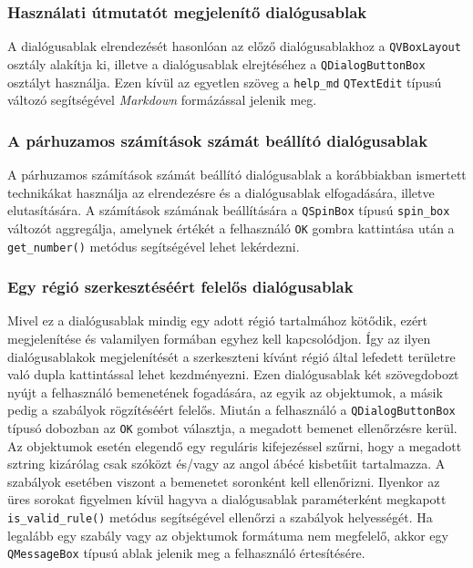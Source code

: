 \subsubsection{Használati útmutatót megjelenítő dialógusablak}

A dialógusablak elrendezését hasonlóan az előző dialógusablakhoz a \verb|QVBoxLayout| osztály alakítja ki, illetve a dialógusablak elrejtéséhez a \verb|QDialogButtonBox| osztályt használja. Ezen kívül az egyetlen szöveg a \verb|help_md| \verb|QTextEdit| típusú változó segítségével \textit{Markdown} formázással jelenik meg.

\subsubsection{A párhuzamos számítások számát beállító dialógusablak}

A párhuzamos számítások számát beállító dialógusablak a korábbiakban ismertett technikákat használja az elrendezésre és a dialógusablak elfogadására, illetve elutasítására. A számítások számának beállítására a \verb|QSpinBox| típusú \verb|spin_box| változót aggregálja, amelynek értékét a felhasználó \verb|OK| gombra kattintása után a \verb|get_number()| metódus segítségével lehet lekérdezni.

\subsubsection{Egy régió szerkesztéséért felelős dialógusablak} 

Mivel ez a dialógusablak mindig egy adott régió tartalmához kötődik, ezért megjelenítése és valamilyen formában egyhez kell kapcsolódjon. Így az ilyen dialógusablakok megjelenítését a szerkeszteni kívánt régió által lefedett területre való dupla kattintással lehet kezdményezni. Ezen dialógusablak két szövegdobozt nyújt a felhasználó bemenetének fogadására, az egyik az objektumok, a másik pedig a szabályok rögzítéséért felelős. Miután a felhasználó a \verb|QDialogButtonBox| típusó dobozban az \verb|OK| gombot választja, a megadott bemenet ellenőrzésre kerül. Az objektumok esetén elegendő egy reguláris kifejezéssel szűrni, hogy a megadott sztring kizárólag csak szóközt és/vagy az angol ábécé kisbetűit tartalmazza. A szabályok esetében viszont a bemenetet soronként kell ellenőrizni. Ilyenkor az üres sorokat figyelmen kívül hagyva a dialógusablak paraméterként megkapott \verb|is_valid_rule()| metódus segítségével ellenőrzi a szabályok helyességét. Ha legalább egy szabály vagy az objektumok formátuma nem megfelelő, akkor egy \verb|QMessageBox| típusú ablak jelenik meg a felhasználó értesítésére. 

